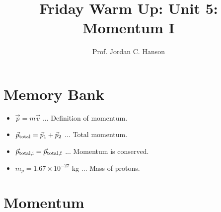 \documentclass{article}
\begin{document}
\twocolumn

\title{Friday Warm Up: Unit 5: Momentum I}
\author{Prof. Jordan C. Hanson}

\maketitle

\section{Memory Bank}

\begin{itemize}
\item $\vec{p} = m\vec{v}$ ... Definition of momentum.
\item $\vec{p}_{\rm total} = \vec{p}_1 + \vec{p}_2$ ... Total momentum.
\item $\vec{p}_{\rm total,i} = \vec{p}_{\rm total,f}$ ... Momentum is conserved.
\item $m_p = 1.67 \times 10^{-27}$ kg ... Mass of protons.
\end{itemize}

\section{Momentum}
\end{document}
